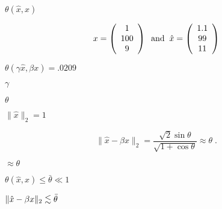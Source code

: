 {\newpage\clearpage
{}%
$\theta ( \hat{x} , x )$%
\lthtmlinlinemathZ
\lthtmlcheckvsize\clearpage}

{\newpage\clearpage
{}%
\begin{displaymath}
x = \left( \begin{array}{c} 1 \\100 \\9 \end{array} \right) \; \; {\rm and} \; \;
\hat{x} = \left( \begin{array}{c} 1.1 \\99 \\11 \end{array} \right) 
\end{displaymath}%
\lthtmldisplayZ
\lthtmlcheckvsize\clearpage}

{\newpage\clearpage
{}%
$\theta ( \gamma \hat{x} , \beta x ) = .0209$%
\lthtmlinlinemathZ
\lthtmlcheckvsize\clearpage}

{\newpage\clearpage
{}%
$\gamma$%
\lthtmlinlinemathZ
\lthtmlcheckvsize\clearpage}

{\newpage\clearpage
{}%
$\theta$%
\lthtmlinlinemathZ
\lthtmlcheckvsize\clearpage}

{\newpage\clearpage
{}%
$\| \hat{x} \|_2 = 1$%
\lthtmlinlinemathZ
\lthtmlcheckvsize\clearpage}

{\newpage\clearpage
{}%
\begin{displaymath}
\| \hat{x} - \beta x \|_2 = \frac{\sqrt{2} \sin \theta}{\sqrt{1+ \cos \theta}} \approx \theta
\; .
\end{displaymath}%
\lthtmldisplayZ
\lthtmlcheckvsize\clearpage}

{\newpage\clearpage
{}%
$\approx \theta$%
\lthtmlinlinemathZ
\lthtmlcheckvsize\clearpage}

{\newpage\clearpage
{}%
$\theta ( \hat{x} , x ) \leq \bar{\theta} \ll 1$%
\lthtmlinlinemathZ
\lthtmlcheckvsize\clearpage}

{\newpage\clearpage
{}%
$\| \hat{x} - \beta x \|_2 \mathrel{\raisebox{-.75ex}{$\mathop{\sim}\limits^{\textstyle <}$}}\bar{\theta}$%
\lthtmlinlinemathZ
\lthtmlcheckvsize\clearpage}

